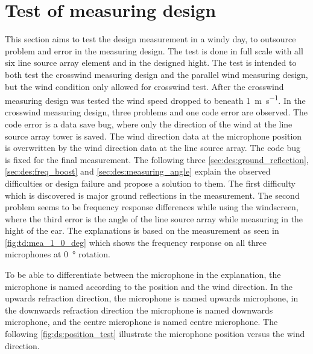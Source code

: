 \section{Test of measuring design}\label{sec:ds:test_of_mes_des}
This section aims to test the design measurement in a windy day, to outsource problem and error in the measuring design. The test is done in full scale with all six line source array element and in the designed hight. The test is intended to both test the crosswind measuring design and the parallel wind measuring design, but the wind condition only allowed for crosswind test. After the crosswind measuring design was tested the wind speed dropped to beneath \SI{1}{\meter\per\second}.
In the crosswind measuring design, three problems and one code error are observed. The code error is a data save bug, where only the direction of the wind at the line source array tower is saved. The wind direction data at the microphone position is overwritten by the wind direction data at the line source array. The code bug is fixed for the final measurement. The following three \autoref{sec:des:ground_reflection}, \autoref{sec:des:freq_boost} and \autoref{sec:des:measuring_angle} explain the observed difficulties or design failure and propose a solution to them. 
The first difficulty which is discovered is major ground reflections in the measurement. The second problem seems to be frequency response differences while using the windscreen, where the third error is the angle of the line source array while measuring in the hight of the ear.  
The explanations is based on the measurement as seen in \autoref{fig:td:mea_1_0_deg} which shows the frequency response on all three microphones at \SI{0}{\degree} rotation.


To be able to differentiate between the microphone in the explanation, the microphone is named according to the position and the wind direction. In the upwards refraction direction, the microphone is named upwards microphone, in the downwards refraction direction the microphone is named downwards microphone, and the centre microphone is named centre microphone. The following \autoref{fig:ds:position_test} illustrate the microphone position versus the wind direction.


